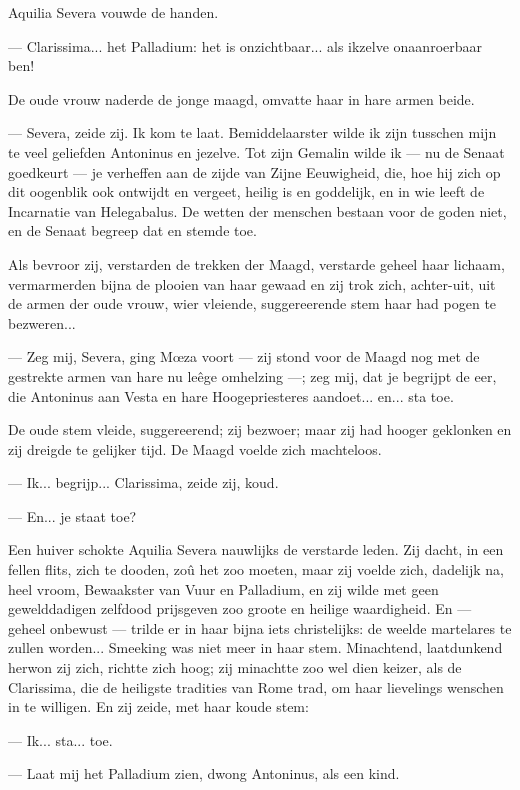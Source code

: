 \documentclass[a4paper, 12pt, oneside, dutch]{article}
\begin{document}
Aquilia Severa vouwde de handen.

--- Clarissima... het Palladium: het is onzichtbaar... als ikzelve onaanroerbaar ben!

De oude vrouw naderde de jonge maagd, omvatte haar in hare armen beide.

--- Severa, zeide zij. Ik kom te laat. Bemiddelaarster wilde ik zijn tusschen mijn te veel geliefden Antoninus en jezelve. Tot zijn Gemalin wilde ik --- nu de Senaat goedkeurt --- je verheffen aan de zijde van Zijne Eeuwigheid, die, hoe hij zich op dit oogenblik ook ontwijdt en vergeet, heilig is en goddelijk, en in wie leeft de Incarnatie van Helegabalus. De wetten der menschen bestaan voor de goden niet, en de Senaat begreep dat en stemde toe.

Als bevroor zij, verstarden de trekken der Maagd, verstarde geheel haar lichaam, vermarmerden bijna de plooien van haar gewaad en zij trok zich, achter-uit, uit de armen der oude vrouw, wier vleiende, suggereerende stem haar had pogen te bezweren...

--- Zeg mij, Severa, ging Mœza voort --- zij stond voor de Maagd nog met de gestrekte armen van hare nu leêge omhelzing ---; zeg mij, dat je begrijpt de eer, die Antoninus aan Vesta en hare Hoogepriesteres aandoet... en... sta toe.

De oude stem vleide, suggereerend; zij bezwoer; maar zij had hooger geklonken en zij dreigde te gelijker tijd. De Maagd voelde zich machteloos.

--- Ik... begrijp... Clarissima, zeide zij, koud.

--- En... je staat toe?

Een huiver schokte Aquilia Severa nauwlijks de verstarde leden. Zij dacht, in een fellen flits, zich te dooden, zoû het zoo moeten, maar zij voelde zich, dadelijk na, heel vroom, Bewaakster van Vuur en Palladium, en zij wilde met geen gewelddadigen zelfdood prijsgeven zoo groote en heilige waardigheid. En --- geheel onbewust --- trilde er in haar bijna iets christelijks: de weelde martelares te zullen worden... Smeeking was niet meer in haar stem. Minachtend, laatdunkend herwon zij zich, richtte zich hoog; zij minachtte zoo wel dien keizer, als de Clarissima, die de heiligste tradities van Rome trad, om haar lievelings wenschen in te willigen. En zij zeide, met haar koude stem:

--- Ik... sta... toe.

--- Laat mij het Palladium zien, dwong Antoninus, als een kind.
\end{document}
